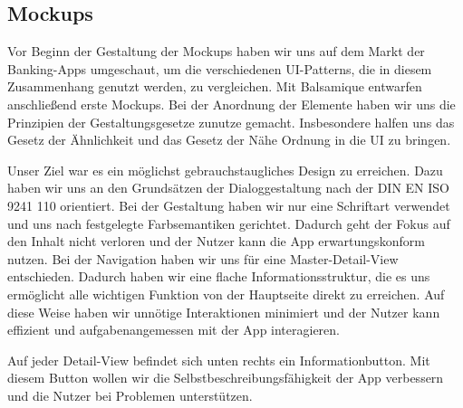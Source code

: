 
\subsection{Mockups}
	Vor Beginn der Gestaltung der Mockups haben wir uns auf dem Markt der Banking-Apps umgeschaut, um die verschiedenen UI-Patterns, die in diesem Zusammenhang genutzt werden, zu vergleichen. Mit Balsamique entwarfen anschließend erste Mockups. Bei der Anordnung der Elemente haben wir uns die Prinzipien der Gestaltungsgesetze zunutze gemacht. Insbesondere halfen uns das Gesetz der Ähnlichkeit und das Gesetz der Nähe Ordnung in die UI zu bringen. 

	Unser Ziel war es ein möglichst gebrauchstaugliches Design zu erreichen. Dazu haben wir uns an den Grundsätzen der Dialoggestaltung nach der DIN EN ISO 9241 110 orientiert. Bei der Gestaltung haben wir nur eine Schriftart verwendet und uns nach festgelegte Farbsemantiken gerichtet. Dadurch geht der Fokus auf den Inhalt nicht verloren und der Nutzer kann die App erwartungskonform nutzen. Bei der Navigation haben wir uns für eine Master-Detail-View entschieden. Dadurch haben wir eine flache Informationsstruktur, die es uns ermöglicht alle wichtigen Funktion von der Hauptseite direkt zu erreichen. Auf diese Weise haben wir unnötige Interaktionen minimiert und der Nutzer kann effizient und aufgabenangemessen mit der App interagieren.  

	Auf jeder Detail-View befindet sich unten rechts ein Informationbutton. Mit diesem Button wollen wir die Selbstbeschreibungsfähigkeit der App verbessern und die Nutzer bei Problemen unterstützen.
	
